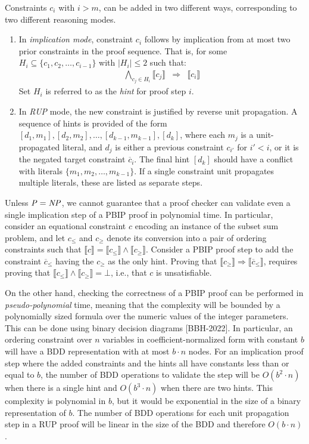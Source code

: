 \documentclass{easychair}
\newcommand{\nil}{\bot}
\renewcommand{\obar}[1]{\overline{#1}}
\newcommand{\mlit}{m}
\newcommand{\imply}{\Rightarrow}
\newcommand{\func}[1]{\llbracket#1\rrbracket}
\begin{document}
Constraints $c_{i}$ with $i > m$, can be added in two different ways, corresponding to two different reasoning modes.
\begin{enumerate}
\item In {\em implication mode}, constraint $c_i$ follows by implication from at most two prior constraints in the  proof sequence.
  That is, for some $H_i \subseteq \{c_1, c_2,
  \ldots, c_{i-1}\}$ with $|H_i| \leq 2$ such that:
\begin{eqnarray}
\bigwedge_{c_j \in H_i} \func{c_j} & \imply & \func{c_i} \label{eqn:implicationmode}
\end{eqnarray}
Set $H_i$ is referred to as the {\em hint} for proof step $i$.
\item In \emph{RUP} mode, the new constraint is justified by reverse
  unit propagation.  A sequence of hints is provided of the form
  $[d_1, \mlit_1], [d_2, \mlit_2], \ldots, [d_{k-1},\mlit_{k-1}], [d_k]$,
  where each $\mlit_j$ is a unit-propagated literal, and
  $d_{j}$ is either a previous constraint $c_{i'}$ for $i' < i$, or it is the negated target constraint $\overline{c}_i$.
  The final hint $[d_k]$ should have a conflict with literals $\{\mlit_1, \mlit_2, \ldots, \mlit_{k-1} \}$.
  If a single constraint unit propagates multiple literals, these are listed as separate steps.

\end{enumerate}

Unless ${\it P} = {\it NP}$, we cannot guarantee that a proof checker
can validate even a single implication step of a PBIP proof in polynomial time.
In particular, consider an equational constraint $c$ encoding an
instance of the subset sum problem, and let $c_{\leq}$ and $c_{\geq}$
denote its conversion into a pair of ordering constraints such that
$\func{c} = \func{c_{\leq}} \land \func{c_{\geq}}$.  Consider a PBIP
proof step to add the constraint $\obar{c}_{\leq}$ having the 
$c_{\geq}$ as the only hint.  Proving that
$\func{c_{\geq}} \imply \func{\obar{c}_{\leq}}$, requires proving that
$\func{c_{\leq}} \land \func{c_{\geq}} = \nil$, i.e., that $c$ is unsatisfiable.

On the other hand, checking the correctness of a PBIP proof can be
performed in {\em pseudo-polynomial} time, meaning that the complexity
will be bounded by a polynomially sized formula over the numeric
values of the integer parameters.  This can be done using binary
decision diagrams [BBH-2022].  In particular, an ordering constraint
over $n$ variables in coefficient-normalized form with constant $b$
will have a BDD representation with at most $b \cdot n$ nodes.  For an
implication proof step where the added constraints and the hints all
have constants less than or equal to $b$, the number of BDD operations
to validate the step will be $O(b^{2} \cdot n)$ when there is a single
hint and $O(b^{3} \cdot n)$ when there are two hints.  This complexity
is polynomial in $b$, but it would be exponential in the size of a
binary representation of $b$.  The number of BDD operations
for each unit propagation step in a RUP proof will be linear in the
size of the BDD and therefore $O(b \cdot n)$\@.
\end{document}
